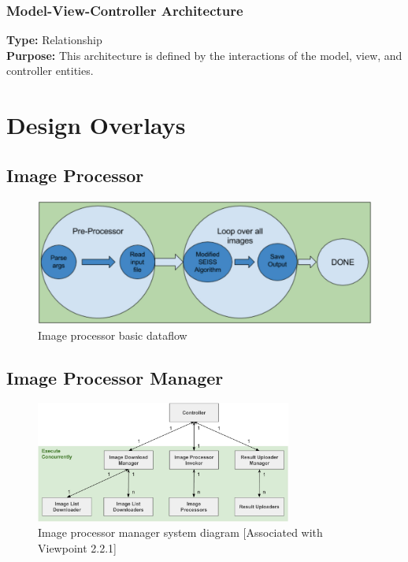 \documentclass[10pt, onecolumn, draftclsnofoot, letterpaper, compsoc]{IEEEtran}
\begin{document}
  \subsubsection{Model-View-Controller Architecture}
  \textbf{Type:} Relationship \\
  \textbf{Purpose:} This architecture is defined by the interactions of the model, view, and controller entities.

\section{Design Overlays}

\subsection{Image Processor}

\begin{figure}[H]
    \centering
    \includegraphics[width=\textwidth]{george_fig.eps}
    \caption{Image processor basic dataflow}
\end{figure}

\subsection{Image Processor Manager}

\begin{figure}[H]
    \centering
    \includegraphics[width=0.75\textwidth]{bret_fig.eps}
    \caption{Image processor manager system diagram [Associated with Viewpoint 2.2.1]}
\end{figure}
\end{document}
